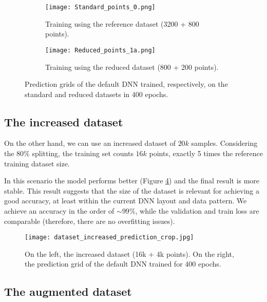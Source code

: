 \begin{figure}[tp] %
  \centering
  \begin{subfigure}{\columnwidth}
  \texttt{[image: Standard\_points\_0.png]}
  \caption{\label{fig:std_dataset_predictions}Training using the reference dataset (3200 + 800 points).}
  \end{subfigure}
  
  \begin{subfigure}{\columnwidth}
  \texttt{[image: Reduced\_points\_1a.png]}
  \caption{\label{fig:reduced_predictions} Training using the reduced dataset (800 + 200 points).}
  \end{subfigure}
  
  \caption{\label{fig:predictions}Prediction grids of the default DNN trained, respectively, on the standard and reduced datasets in 400 epochs.}
\end{figure}




\subsection{The increased dataset}
\label{ssec:increased_dataset}

On the other hand, we can use an increased dataset of $20k$ samples. Considering the $80\%$ splitting, the training set counts $16k$ points, exactly 5 times the reference training dataset size.

In this scenario the model performs better (Figure \ref{fig:increased_predictions}) and the final result is more stable. This result suggests that the size of the dataset is relevant for achieving a good accuracy, at least within the current DNN layout and data pattern. We achieve an accuracy in the order of $\sim 99\%$, while the validation and train loss are comparable (therefore, there are no overfitting issues).

\begin{figure}[h]
  \centering
  \texttt{[image: dataset\_increased\_prediction\_crop.jpg]}
  \caption{On the left, the increased dataset (16k + 4k points). On the right, the prediction grid of the default DNN trained for 400 epochs. }
  \label{fig:increased_predictions}
\end{figure}





\subsection{The augmented dataset}
\label{ssec:augmented_dataset}

